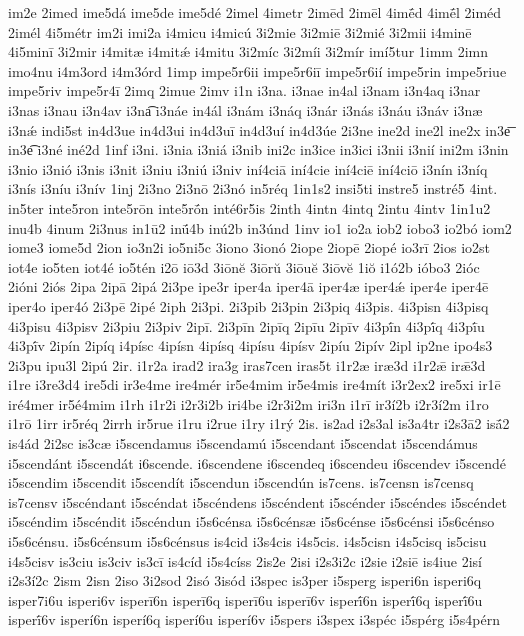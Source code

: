 {im2e
2imed
ime5dá
ime5de
ime5dé
2imel
4imetr
2imēd
2imēl
4imḗd
4imḗl
2iméd
2imél
4i5métr
im2i
imi2a
i4micu
i4micú
3i2mie
3i2miē
3i2mié
3i2mii
i4minē
4i5minī
3i2mir
i4mitæ
i4mitǽ
i4mitu
3i2míc
3i2míi
3i2mír
imí5tur
1imm
2imn
imo4nu
i4m3ord
i4m3órd
1imp
impe5r6ii
impe5r6iī
impe5r6ií
impe5rin
impe5riue
impe5riv
impe5r4ī
2imq
2imue
2imv
i1n
i3na.
i3nae
in4al
i3nam
i3n4aq
i3nar
i3nas
i3nau
i3n4av
i3na͡
i3náe
in4ál
i3nám
i3náq
i3nár
i3nás
i3náu
i3náv
i3næ
i3nǽ
indi5st
in4d3ue
in4d3ui
in4d3uī
in4d3uí
in4d3úe
2i3ne
ine2d
ine2l
ine2x
in3e͞
in3e͡
i3né
iné2d
1inf
i3ni.
i3nia
i3niá
i3nib
ini2c
in3ice
in3ici
i3nii
i3nií
ini2m
i3nin
i3nio
i3nió
i3nis
i3nit
i3niu
i3niú
i3niv
iní4ciā
iní4cie
iní4ciē
iní4ciō
i3nín
i3níq
i3nís
i3níu
i3nív
1inj
2i3no
2i3nō
2i3nó
in5réq
1in1s2
insi5ti
instre5
instré5
4int.
in5ter
inte5ron
inte5rōn
inte5rṓn
inté6r5is
2inth
4intn
4intq
2intu
4intv
1in1u2
inu4b
4inum
2i3nus
in1ū2
inū́4b
inú2b
in3únd
1inv
io1
io2a
iob2
iobo3
io2bó
iom2
iome3
iome5d
2ion
io3n2i
io5ni5c
3iono
3ionó
2iope
2iopē
2iopé
io3rī
2ios
io2st
iot4e
io5ten
iot4é
io5tén
i2ō
iō3d
3iōnĕ
3iōrŭ
3iōuĕ
3iōvĕ
1iŏ
i1ó2b
ióbo3
2ióc
2ióni
2iós
2ipa
2ipā
2ipá
2i3pe
ipe3r
iper4a
iper4ā
iper4æ
iper4ǽ
iper4e
iper4ē
iper4o
iper4ó
2i3pē
2ipé
2iph
2i3pi.
2i3pib
2i3pin
2i3piq
4i3pis.
4i3pisn
4i3pisq
4i3pisu
4i3pisv
2i3piu
2i3piv
2ipī.
2i3pīn
2ipīq
2ipīu
2ipīv
4i3pī́n
4i3pī́q
4i3pī́u
4i3pī́v
2ipín
2ipíq
i4písc
4ipísn
4ipísq
4ipísu
4ipísv
2ipíu
2ipív
2ipl
ip2ne
ipo4s3
2i3pu
ipu3l
2ipú
2ir.
i1r2a
irad2
ira3g
iras7cen
iras5t
i1r2æ
iræ3d
i1r2ǣ
irǣ3d
i1re
i3re3d4
ire5di
ir3e4me
ire4mér
ir5e4mim
ir5e4mis
ire4mít
i3r2ex2
ire5xi
ir1ē
iré4mer
ir5é4mim
i1rh
i1r2i
i2r3i2b
iri4be
i2r3i2m
iri3n
i1rī
ir3í2b
i2r3í2m
i1ro
i1rō
1irr
ir5réq
2irrh
ir5rue
i1ru
i2rue
i1ry
i1rý
2is.
is2ad
i2s3al
is3a4tr
i2s3ā2
isā́2
is4ád
2i2sc
is3cæ
i5scendamus
i5scendamú
i5scendant
i5scendat
i5scendámus
i5scendánt
i5scendát
i6scende.
i6scendene
i6scendeq
i6scendeu
i6scendev
i5scendé
i5scendim
i5scendit
i5scendít
i5scendun
i5scendún
is7cens.
is7censn
is7censq
is7censv
i5scéndant
i5scéndat
i5scéndens
i5scéndent
i5scénder
i5scéndes
i5scéndet
i5scéndim
i5scéndit
i5scéndun
i5s6cénsa
i5s6cénsæ
i5s6cénse
i5s6cénsi
i5s6cénso
i5s6cénsu.
i5s6cénsum
i5s6cénsus
is4cid
i3s4cis
i4s5cis.
i4s5cisn
i4s5cisq
is5cisu
i4s5cisv
is3ciu
is3civ
is3cī
is4cíd
i5s4císs
2is2e
2isi
i2s3i2c
i2sie
i2siē
is4iue
2isí
i2s3í2c
2ism
2isn
2iso
3i2sod
2isó
3isód
i3spec
is3per
i5sperg
isperi6n
isperi6q
isper7i6u
isperi6v
isperī6n
isperī6q
isperī6u
isperī6v
isperī́6n
isperī́6q
isperī́6u
isperī́6v
isperí6n
isperí6q
isperí6u
isperí6v
i5spers
i3spex
i3spéc
i5spérg
i5s4pérn
}
